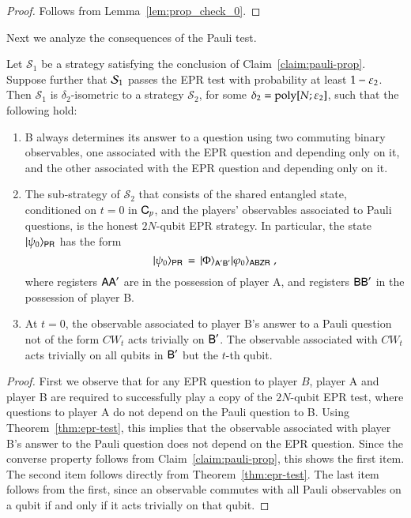 \begin{proof}
Follows from Lemma~\ref{lem:prop_check_0}.
\end{proof}


Next we analyze the consequences of the Pauli test. 

\begin{claim}\label{claim:pauli-epr}
Let $\mathcal{S}_1$ be a strategy satisfying the conclusion of Claim~\ref{claim:pauli-prop}. Suppose further that $\mathcal{S}_1$ passes the EPR test with probability at least $1 - \varepsilon_2$. Then $\mathcal{S}_1$ is $\delta_2$-isometric to a strategy $\mathcal{S}_2$, for some $\delta_2 = \operatorname{poly}[N;\varepsilon_2]$, such that the following hold:
\begin{enumerate}
\item B always determines its answer to a question using two commuting binary observables, one associated with the EPR question and depending only on it, and the other associated with the EPR question and depending only on it.  
\item The sub-strategy of $\mathcal{S}_2$ that consists of the shared entangled state, conditioned on $t=0$ in ${\mathsf{C}}_p$, and the players' observables associated to Pauli questions, is the honest $2N$-qubit EPR strategy. In particular, the state $|\psi_0\rangle_{{\textsf{PR}}}$ has the form 
\[ |\psi_0\rangle_{{\textsf{PR}}} \,=\, |\Phi\rangle_{{\textsf{A}}'{\textsf{B}}'} |\varphi_0\rangle_{{\textsf{ABZR}}}\;,\]
where registers ${\textsf{A}}{\textsf{A}}'$ are in the possession of player A, and registers ${\textsf{B}}{\textsf{B}}'$ in the possession of player B. 
\item At $t=0$, the observable associated to player B's answer to a Pauli question not of the form $CW_t$ acts trivially on ${\textsf{B}}'$. The observable associated with $CW_t$ acts trivially on all qubits in ${\textsf{B}}'$ but the $t$-th qubit.
\end{enumerate}  
\end{claim}

\begin{proof}
First we observe that for any EPR question to player $B$, player A and player B are required to successfully play a copy of the $2N$-qubit EPR test, where questions to player A do not depend on the Pauli question to B. Using Theorem~\ref{thm:epr-test}, this implies that the observable associated with player B's answer to the Pauli question does not depend on the EPR question. Since the converse property follows from Claim~\ref{claim:pauli-prop}, this shows the first item. The second item follows directly from Theorem~\ref{thm:epr-test}. The last item follows from the first, since an observable commutes with all Pauli observables on a qubit if and only if it acts trivially on that qubit.   
\end{proof}

